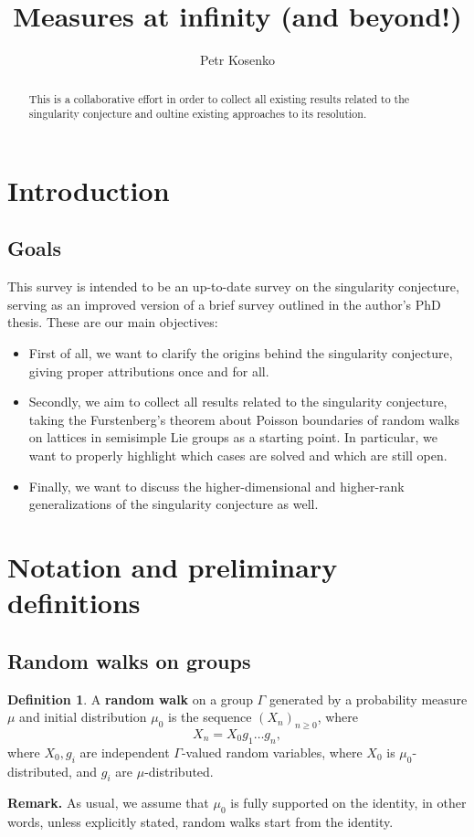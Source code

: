 \documentclass[11pt]{amsart}
\title{Measures at infinity (and beyond!)}
\author{Petr Kosenko}
\theoremstyle{definition}
\newtheorem{definition}{Definition}[section]
\begin{document}
	\maketitle
	\begin{abstract}
		This is a collaborative effort in order to collect all existing results related to the singularity conjecture and oultine existing approaches to its resolution.
	\end{abstract}
	
	\section{Introduction}
	\subsection{Goals}
	This survey is intended to be an up-to-date survey on the singularity conjecture, serving as an improved version of a brief survey outlined in the author's PhD thesis. These are our main objectives:
	\begin{itemize}
		\item First of all, we want to clarify the origins behind the singularity conjecture, giving proper attributions once and for all.
		\item Secondly, we aim to collect all results related to the singularity conjecture, taking the Furstenberg's theorem about Poisson boundaries of random walks on lattices in semisimple Lie groups as a starting point. In particular, we want to properly highlight which cases are solved and which are still open.
		\item Finally, we want to discuss the higher-dimensional and higher-rank generalizations of the singularity conjecture as well.
	\end{itemize}
	
	\section{Notation and preliminary definitions}
		\subsection{Random walks on groups}
			\begin{definition}
				A \textbf{random walk} on a group $\Gamma$ generated by a probability measure $\mu$ and initial distribution $\mu_0$ is the sequence $(X_n)_{n \ge 0}$, where 
				\[
				X_n = X_0 g_1 \dots g_n,
				\]
				where $X_0, g_i$ are independent $\Gamma$-valued random variables, where $X_0$ is $\mu_0$-distributed, and $g_i$ are $\mu$-distributed.
			\end{definition}
			\textbf{Remark.} As usual, we assume that $\mu_0$ is fully supported on the identity, in other words, unless explicitly stated, random walks start from the identity.
	
\end{document}
